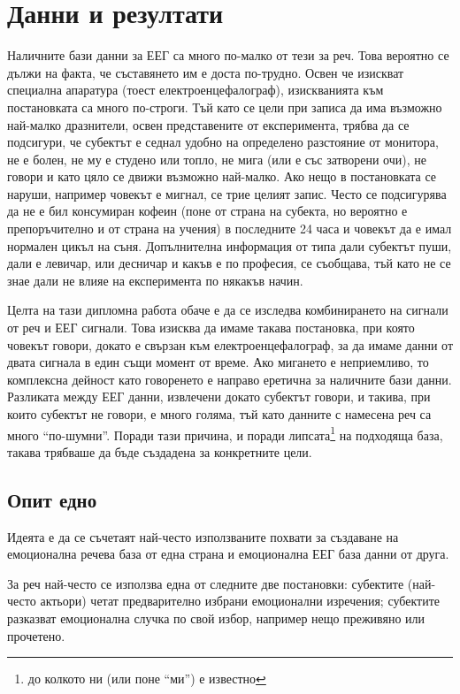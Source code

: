 \documentclass[main.tex]{subfiles}
\begin{document}
\section{Данни и резултати}

Наличните бази данни за ЕЕГ са много по-малко от тези за реч. Това вероятно се дължи на факта, че съставянето им е доста по-трудно. Освен че изискват специална апаратура (тоест електроенцефалограф), изискванията към постановката са много по-строги. Тъй като се цели при записа да има възможно най-малко дразнители, освен представените от експеримента, трябва да се подсигури, че субектът е седнал удобно на определено разстояние от монитора, не е болен, не му е студено или топло, не мига (или е със затворени очи), не говори и като цяло се движи възможно най-малко. Ако нещо в постановката се наруши, например човекът е мигнал, се трие целият запис. Често се подсигурява да не е бил консумиран кофеин (поне от страна на субекта, но вероятно е препоръчително и от страна на учения) в последните 24 часа и човекът да е имал нормален цикъл на съня. Допълнителна информация от типа дали субектът пуши, дали е левичар, или десничар и какъв е по професия, се съобщава, тъй като не се знае дали не влияе на експеримента по някакъв начин. 

Целта на тази дипломна работа обаче е да се изследва комбинирането на сигнали от реч и ЕЕГ сигнали. Това изисква да имаме такава постановка, при която човекът говори, докато е свързан към електроенцефалограф, за да имаме данни от двата сигнала в един същи момент от време. Ако мигането е неприемливо, то комплексна дейност като говоренето е направо еретична за наличните бази данни. Разликата между ЕЕГ данни, извлечени докато субектът говори, и такива, при които субектът не говори, е много голяма, тъй като данните с намесена реч са много ``по-шумни''. Поради тази причина, и поради липсата\footnote{до колкото ни (или поне ``ми'') е известно} на подходяща база, такава трябваше да бъде създадена за конкретните цели.


\subsection{Опит едно}
Идеята е да се съчетаят най-често използваните похвати за създаване на емоционална речева база от една страна и емоционална ЕЕГ база данни от друга.

За реч най-често се използва една от следните две постановки: субектите (най-често актьори) четат предварително избрани емоционални изречения; субектите разказват емоционална случка по свой избор, например нещо преживяно или прочетено.
\end{document}
